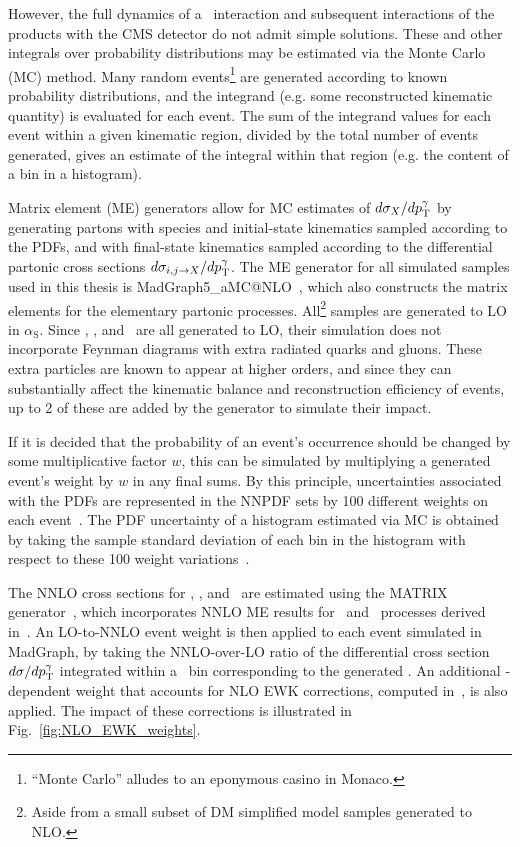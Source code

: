 However, the full dynamics of a \Pp\Pp\ interaction and subsequent interactions of the products with the CMS detector do not admit simple solutions.
These and other integrals over probability distributions may be estimated
via the Monte Carlo (MC) method. Many random events\footnote{``Monte Carlo'' alludes to an eponymous casino in Monaco.}
are generated according to known probability distributions,
and the integrand (e.g. some reconstructed kinematic quantity) is evaluated for each event.
The sum of the integrand values for each event within a given kinematic region,
divided by the total number of events generated, gives an estimate of the integral within that region (e.g. the
content of a bin in a histogram).

Matrix element (ME) generators allow for MC estimates of $d\sigma_{X}/dp^{\gamma}_\mathrm{T}$ by generating
partons with species and initial-state kinematics sampled according to the PDFs, and with final-state kinematics sampled
according to the differential partonic cross sections $d\sigma_{i,j \to X}/dp^{\gamma}_\mathrm{T}$.
The ME generator for all simulated samples used in this thesis is MadGraph5\_aMC@NLO~\cite{ref:JHEP07(2014)079},
which also constructs the matrix elements for the elementary partonic processes.
All\footnote{Aside from a small subset of DM simplified model samples generated to NLO.} samples are generated to LO in $\alpha_\mathrm{S}$.
Since \zinvg, \wlng, and \zllg\ are all generated to LO, their simulation does
not incorporate Feynman diagrams with extra radiated quarks and gluons. These extra particles are known
to appear at higher orders, and since they can substantially affect the kinematic balance and reconstruction
efficiency of events, up to 2 of these are added by the generator to simulate their impact.

If it is decided that the probability of an event's occurrence should be changed by some multiplicative factor $w$, this can be simulated
by multiplying a generated event's weight by $w$ in any final sums. By this principle, uncertainties associated with the PDFs are
represented in the NNPDF sets by 100 different weights on each event~\cite{ref:NNPDF30,ref:NNPDF31}. The PDF uncertainty of a histogram
estimated via MC is obtained by taking the sample standard deviation of each bin in the histogram with respect to these 100 weight variations~\cite{ref:0954-3899/43/2/023001}.

The NNLO cross sections for \zinvg, \wlng, and \zllg\ are estimated using the MATRIX generator~\cite{ref:epjc/s10052-018-5771-7},
which incorporates NNLO ME results for \PZ\Pgamma\ and \PW\Pgamma\ processes derived in~\cite{ref:j.physletb.2014.02.037, ref:JHEP07(2015)085, ref:JHEP12(2015)047}.
An LO-to-NNLO event weight is then applied to each event simulated in MadGraph, by taking the NNLO-over-LO ratio of the differential cross section $d\sigma/dp^{\gamma}_\mathrm{T}$
integrated within a \pTgamma\ bin corresponding to the generated \Pgamma.
An additional \pTgamma-dependent weight that accounts for NLO EWK corrections, computed in~\cite{ref:JHEP04(2015)018, ref:JHEP02(2016)057}, is also applied.
The impact of these corrections is illustrated in Fig.~\ref{fig:NLO_EWK_weights}.

